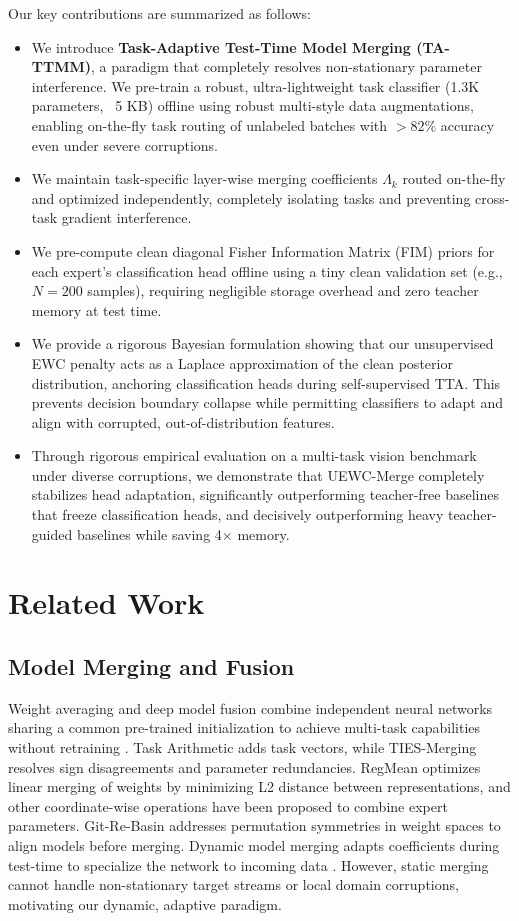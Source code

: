 \documentclass{article}
\theoremstyle{plain}
\theoremstyle{definition}
\theoremstyle{remark}
\begin{document}
Our key contributions are summarized as follows:
\begin{itemize}
    \itemsep0em
    \item We introduce \textbf{Task-Adaptive Test-Time Model Merging (TA-TTMM)}, a paradigm that completely resolves non-stationary parameter interference. We pre-train a robust, ultra-lightweight task classifier (1.3K parameters, ~5 KB) offline using robust multi-style data augmentations, enabling on-the-fly task routing of unlabeled batches with $>82\%$ accuracy even under severe corruptions.
    \item We maintain task-specific layer-wise merging coefficients $\Lambda_k$ routed on-the-fly and optimized independently, completely isolating tasks and preventing cross-task gradient interference.
    \item We pre-compute clean diagonal Fisher Information Matrix (FIM) priors for each expert's classification head offline using a tiny clean validation set (e.g., $N=200$ samples), requiring negligible storage overhead and zero teacher memory at test time.
    \item We provide a rigorous Bayesian formulation showing that our unsupervised EWC penalty acts as a Laplace approximation of the clean posterior distribution, anchoring classification heads during self-supervised TTA. This prevents decision boundary collapse while permitting classifiers to adapt and align with corrupted, out-of-distribution features.
    \item Through rigorous empirical evaluation on a multi-task vision benchmark under diverse corruptions, we demonstrate that UEWC-Merge completely stabilizes head adaptation, significantly outperforming teacher-free baselines that freeze classification heads, and decisively outperforming heavy teacher-guided baselines while saving 4$\times$ memory.
\end{itemize}

\section{Related Work}
\subsection{Model Merging and Fusion}
Weight averaging and deep model fusion combine independent neural networks sharing a common pre-trained initialization to achieve multi-task capabilities without retraining \cite{Wortsman22,Matena22}. Task Arithmetic \cite{Ilharco22} adds task vectors, while TIES-Merging \cite{Yadav23} resolves sign disagreements and parameter redundancies. RegMean \cite{jin2022regmean} optimizes linear merging of weights by minimizing L2 distance between representations, and other coordinate-wise operations have been proposed to combine expert parameters. Git-Re-Basin \cite{ainsworth2022git} addresses permutation symmetries in weight spaces to align models before merging. Dynamic model merging adapts coefficients during test-time to specialize the network to incoming data \cite{Yang24,Jung25}. However, static merging cannot handle non-stationary target streams or local domain corruptions, motivating our dynamic, adaptive paradigm.
\end{document}
